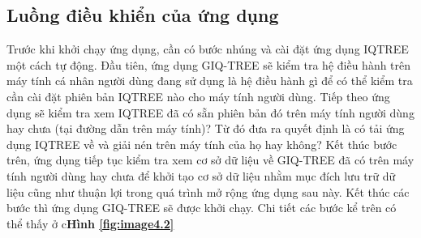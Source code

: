 \documentclass[12pt]{report}
\begin{document}
\subsection{Luồng điều khiển của ứng dụng}
Trước khi khởi chạy ứng dụng, cần có bước nhúng và cài đặt ứng dụng IQTREE một cách tự động. Đầu tiên, ứng dụng GIQ-TREE sẽ kiểm tra hệ điều hành trên máy tính cá nhân người dùng đang sử dụng là hệ điều hành gì để có thể kiểm tra cần cài đặt phiên bản IQTREE nào cho máy tính người dùng. Tiếp theo ứng dụng sẽ kiểm tra xem IQTREE đã có sẵn phiên bản đó trên máy tính người dùng hay chưa (tại đường dẫn trên máy tính)? Từ đó đưa ra quyết định là có tải ứng dụng IQTREE về và giải nén trên máy tính của họ hay không? Kết thúc bước trên, ứng dụng tiếp tục kiểm tra xem cơ sở dữ liệu về GIQ-TREE đã có trên máy tính người dùng hay chưa để khởi tạo cơ sở dữ liệu nhằm mục đích lưu trữ dữ liệu cũng như thuận lợi trong quá trình mở rộng ứng dụng sau này. Kết thúc các bước thì ứng dụng GIQ-TREE sẽ được khởi chạy. Chi tiết các bước kể trên có thể thấy ở c\textbf{Hình \ref{fig:image4.2}}
\end{document}
